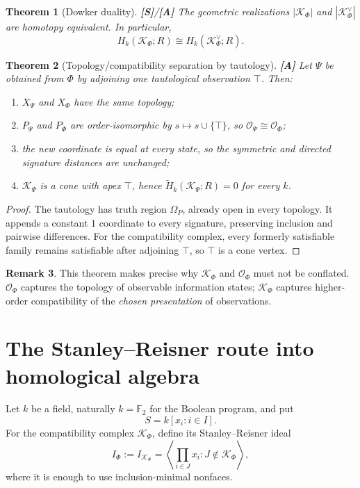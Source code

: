 \documentclass[11pt]{article}
\newtheorem{theorem}{Theorem}[section]
\theoremstyle{definition}
\newtheorem{remark}[theorem]{Remark}
\newcommand{\F}{\mathbb F_2}
\newcommand{\Om}{\Omega_P}
\newcommand{\OX}{\mathcal O}
\newcommand{\K}{\mathcal K}
\newcommand{\statusS}{\textbf{[S]}}
\newcommand{\statusA}{\textbf{[A]}}
\begin{document}
\begin{theorem}[Dowker duality]
\statusS/\statusA\;
The geometric realizations $|\K_\Phi|$ and $|\K_\Phi^{\vee}|$ are homotopy equivalent. In particular,
\[
H_k(\K_\Phi;R)\cong H_k(\K_\Phi^{\vee};R).
\]
\end{theorem}

\begin{theorem}[Topology/compatibility separation by tautology]\label{thm:tautology}
\statusA\;
Let $\Psi$ be obtained from $\Phi$ by adjoining one tautological observation $\top$.
Then:
\begin{enumerate}[label=(\roman*)]
\item $X_\Psi$ and $X_\Phi$ have the same topology;
\item $P_\Psi$ and $P_\Phi$ are order-isomorphic by $s\mapsto s\cup\{\top\}$, so $\OX_\Psi\cong\OX_\Phi$;
\item the new coordinate is equal at every state, so the symmetric and directed signature distances are unchanged;
\item $\K_\Psi$ is a cone with apex $\top$, hence $\widetilde H_k(\K_\Psi;R)=0$ for every $k$.
\end{enumerate}
\end{theorem}

\begin{proof}
The tautology has truth region $\Om$, already open in every topology. It appends a constant $1$ coordinate to every signature, preserving inclusion and pairwise differences. For the compatibility complex, every formerly satisfiable family remains satisfiable after adjoining $\top$, so $\top$ is a cone vertex.
\end{proof}

\begin{remark}
This theorem makes precise why $\K_\Phi$ and $\OX_\Phi$ must not be conflated. $\OX_\Phi$ captures the topology of observable information states; $\K_\Phi$ captures higher-order compatibility of the \emph{chosen presentation} of observations.
\end{remark}

\section{The Stanley--Reisner route into homological algebra}

Let $k$ be a field, naturally $k=\F$ for the Boolean program, and put
\[
S=k[x_i:i\in I].
\]
For the compatibility complex $\K_\Phi$, define its Stanley--Reisner ideal
\[
I_\Phi
:=I_{\K_\Phi}
=\left\langle
\prod_{i\in J}x_i:
J\notin\K_\Phi
\right\rangle,
\]
where it is enough to use inclusion-minimal nonfaces.
\end{document}
